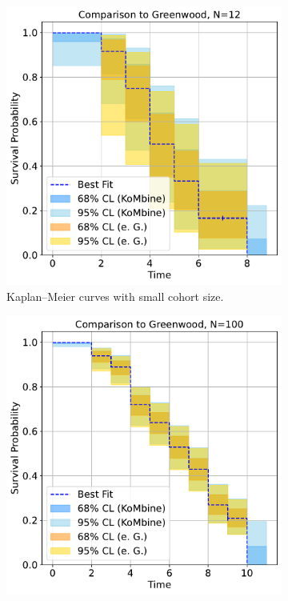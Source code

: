 \documentclass[article]{jss}
\newcommand{\KM}{Kaplan--Meier} %
\begin{document}
\begin{figure}
\centering
\begin{subfigure}[t]{0.49\textwidth}
  \centering
  \includegraphics{comparison_to_greenwood_small_n.pdf}
  \caption{\label{fig:compare-to-greenwood-small-n} \KM{} curves with small cohort size.}
\end{subfigure}
\begin{subfigure}[t]{0.49\textwidth}
  \centering
  \includegraphics{comparison_to_greenwood_large_n.pdf}

\end{subfigure}
\end{figure}
\end{document}
